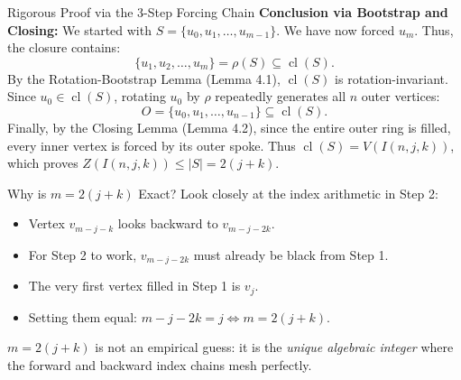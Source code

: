 \documentclass[11pt]{article}
\begin{document}
\begin{defbox}{Rigorous Proof via the 3-Step Forcing Chain}
\noindent\textbf{Conclusion via Bootstrap and Closing:}
We started with $S = \{u_0, u_1, \dots, u_{m-1}\}$. We have now forced $u_m$.
Thus, the closure contains:
\begin{equation}
  \{u_1, u_2, \dots, u_m\} = \rho(S) \subseteq \operatorname{cl}(S).
\end{equation}
By the Rotation-Bootstrap Lemma (Lemma 4.1), $\operatorname{cl}(S)$ is rotation-invariant.
Since $u_0 \in \operatorname{cl}(S)$, rotating $u_0$ by $\rho$ repeatedly generates all $n$ outer vertices:
\begin{equation}
  O = \{u_0, u_1, \dots, u_{n-1}\} \subseteq \operatorname{cl}(S).
\end{equation}
Finally, by the Closing Lemma (Lemma 4.2), since the entire outer ring is filled, every inner vertex is forced by its outer spoke.
Thus $\operatorname{cl}(S) = V(I(n, j, k))$, which proves $Z(I(n, j, k)) \le |S| = 2(j+k)$. \qedhere
\end{defbox}

\begin{callbox}{Why is $m = 2(j+k)$ Exact?}
Look closely at the index arithmetic in Step 2:
\begin{itemize}[leftmargin=*,nosep]
  \item Vertex $v_{m-j-k}$ looks backward to $v_{m-j-2k}$.
  \item For Step 2 to work, $v_{m-j-2k}$ must already be black from Step 1.
  \item The very first vertex filled in Step 1 is $v_j$.
  \item Setting them equal: $m - j - 2k = j \iff m = 2(j+k)$.
\end{itemize}
$m = 2(j+k)$ is not an empirical guess: it is the \emph{unique algebraic integer} where the forward and backward index chains mesh perfectly.
\end{callbox}
\end{document}
